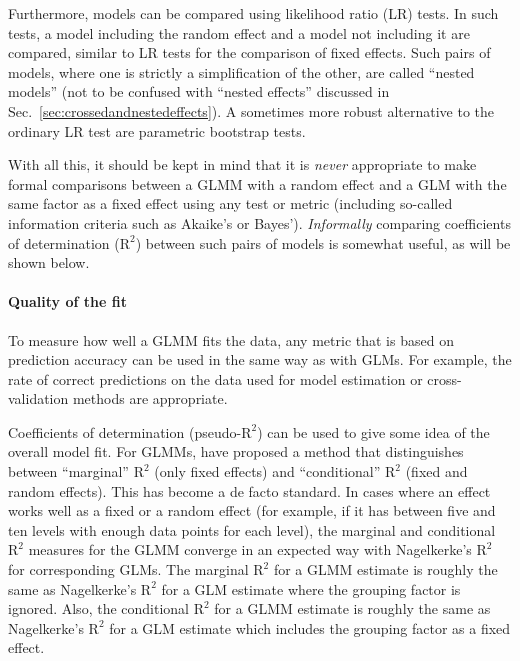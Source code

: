 Furthermore, models can be compared using likelihood ratio (LR) tests.
In such tests, a model including the random effect and a model not including it are compared, similar to LR tests for the comparison of fixed effects.
Such pairs of models, where one is strictly a simplification of the other, are called ``nested models'' (not to be confused with ``nested effects'' discussed in Sec.~\ref{sec:crossedandnestedeffects}).
A sometimes more robust alternative to the ordinary LR test are parametric bootstrap tests. 

With all this, it should be kept in mind that it is \textit{never} appropriate to make formal comparisons between a GLMM with a random effect and a GLM with the same factor as a fixed effect using any test or metric (including so-called information criteria such as Akaike's or Bayes').
\textit{Informally} comparing coefficients of determination ($\textrm{R}^{\textrm{2}}$) between such pairs of models is somewhat useful, as will be shown below.

\paragraph{Quality of the fit}

To measure how well a GLMM fits the data, any metric that is based on prediction accuracy can be used in the same way as with GLMs.
For example, the rate of correct predictions on the data used for model estimation or cross-validation methods are appropriate.

Coefficients of determination (pseudo-$\textrm{R}^{\textrm{2}}$) can be used to give some idea of the overall model fit.
For GLMMs, \citet{NakagawaSchielzeth2013} have proposed a method that distinguishes between ``marginal'' $\textrm{R}^{\textrm{2}}$ (only fixed effects) and ``conditional'' $\textrm{R}^{\textrm{2}}$ (fixed and random effects).
This has become a de facto standard.
In cases where an effect works well as a fixed or a random effect (for example, if it has between five and ten levels with enough data points for each level), the marginal and conditional $\textrm{R}^{\textrm{2}}$ measures for the GLMM converge in an expected way with Nagelkerke's $\textrm{R}^{\textrm{2}}$ for corresponding GLMs.
The marginal $\textrm{R}^{\textrm{2}}$ for a GLMM estimate is roughly the same as Nagelkerke's $\textrm{R}^{\textrm{2}}$ for a GLM estimate where the grouping factor is ignored.
Also, the conditional $\textrm{R}^{\textrm{2}}$ for a GLMM estimate is roughly the same as Nagelkerke's $\textrm{R}^{\textrm{2}}$ for a GLM estimate which includes the grouping factor as a fixed effect.


